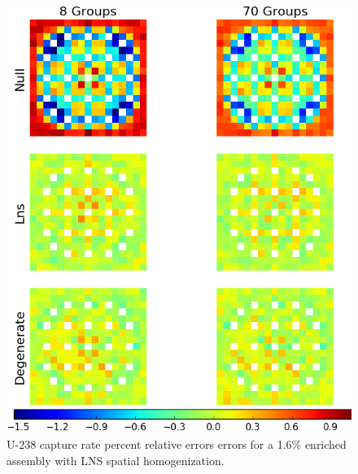\begin{figure}[h!]
\centering
\includegraphics[width=\linewidth]{figures/patterns/lns/assm-16/capt-err}
\vspace{2mm}
\caption[U-238 capture rate errors for a 1.6\% enriched assembly]{U-238 capture rate percent relative errors errors for a 1.6\% enriched assembly with \ac{LNS} spatial homogenization.}
\label{fig:chap9-assm-1.6-lns-capt-err}
\end{figure}

\clearpage

